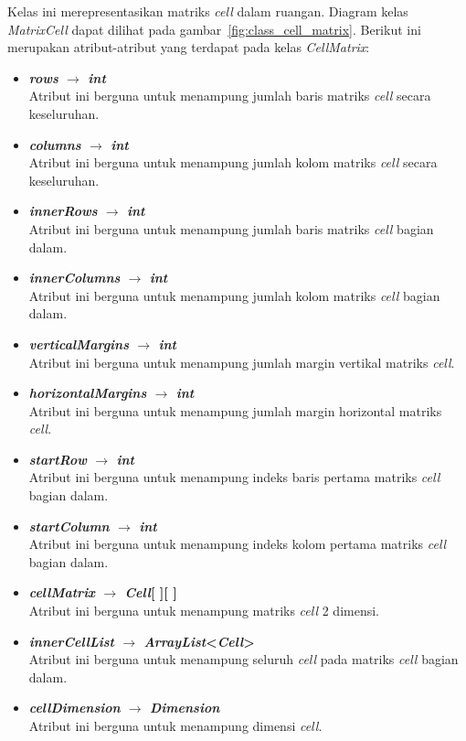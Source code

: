 Kelas ini merepresentasikan matriks \textit{cell} dalam ruangan. Diagram kelas \textit{MatrixCell} dapat dilihat pada gambar~\ref{fig:class_cell_matrix}. Berikut ini merupakan atribut-atribut yang terdapat pada kelas \textit{CellMatrix}:
\begin{itemize}
	\item \textbf{\textit{rows} \(\rightarrow\) \textit{int}}\\
	Atribut ini berguna untuk menampung jumlah baris matriks \textit{cell} secara keseluruhan.
	\item \textbf{\textit{columns} \(\rightarrow\) \textit{int}}\\
	Atribut ini berguna untuk menampung jumlah kolom matriks \textit{cell} secara keseluruhan.
	\item \textbf{\textit{innerRows} \(\rightarrow\) \textit{int}}\\
	Atribut ini berguna untuk menampung jumlah baris matriks \textit{cell} bagian dalam.
	\item \textbf{\textit{innerColumns} \(\rightarrow\) \textit{int}}\\
	Atribut ini berguna untuk menampung jumlah kolom matriks \textit{cell} bagian dalam.
	\item \textbf{\textit{verticalMargins} \(\rightarrow\) \textit{int}}\\
	Atribut ini berguna untuk menampung jumlah margin vertikal matriks \textit{cell}.
	\item \textbf{\textit{horizontalMargins} \(\rightarrow\) \textit{int}}\\
	Atribut ini berguna untuk menampung jumlah margin horizontal matriks \textit{cell}.
	\item \textbf{\textit{startRow} \(\rightarrow\) \textit{int}}\\
	Atribut ini berguna untuk menampung indeks baris pertama matriks \textit{cell} bagian dalam.
	\item \textbf{\textit{startColumn} \(\rightarrow\) \textit{int}}\\
	Atribut ini berguna untuk menampung indeks kolom pertama matriks \textit{cell} bagian dalam.
	\item \textbf{\textit{cellMatrix} \(\rightarrow\) \textit{Cell}[ ][ ]}\\
	Atribut ini berguna untuk menampung matriks \textit{cell} 2 dimensi.
	\item \textbf{\textit{innerCellList} \(\rightarrow\) \textit{ArrayList}<\textit{Cell}>}\\
	Atribut ini berguna untuk menampung seluruh \textit{cell} pada matriks \textit{cell} bagian dalam.
	\item \textbf{\textit{cellDimension} \(\rightarrow\) \textit{Dimension}}\\
	Atribut ini berguna untuk menampung dimensi \textit{cell}.
\end{itemize}

